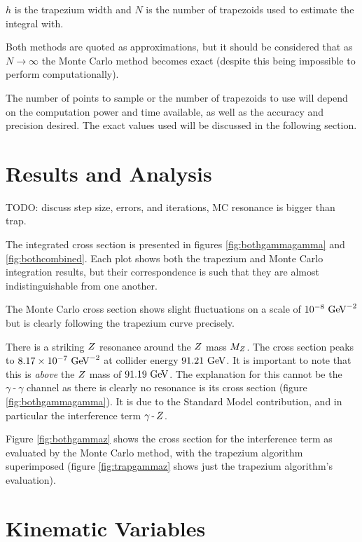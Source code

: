 \documentclass[]{article}
\providecommand{\e}[1]{\ensuremath{\times 10^{#1}}}
\begin{document}
$h$ is the trapezium width and $N$ is the number of trapezoids used to estimate the integral with.

Both methods are quoted as approximations, but it should be considered that as $N \to \infty$ the Monte Carlo method becomes exact (despite this being impossible to perform computationally).

The number of points to sample or the number of trapezoids to use will depend on the computation power and time available, as well as the accuracy and precision desired. The exact values used will be discussed in the following section.


\section{Results and Analysis}\label{sec:results}

TODO: discuss step size, errors, and iterations, MC resonance is bigger than trap.

The integrated cross section is presented in figures \ref{fig:bothgammagamma} and \ref{fig:bothcombined}. Each plot shows both the trapezium and Monte Carlo integration results, but their correspondence is such that they are almost indistinguishable from one another.

The Monte Carlo cross section shows slight fluctuations on a scale of $10^{-8}\GeV^{-2}$ but is clearly following the trapezium curve precisely.

There is a striking $Z $ resonance around the $Z $ mass $M_{Z }$. The cross section peaks to $8.17\e{-7}\GeV^{-2}$ at collider energy $91.21\GeV$. It is important to note that this is \emph{above} the $Z $ mass of $91.19\GeV$. The explanation for this cannot be the $\gamma\operatorname{-}\gamma$ channel as there is clearly no resonance is its cross section (figure \ref{fig:bothgammagamma}). It is due to the Standard Model contribution, and in particular the interference term $\gamma\operatorname{-}Z $.

Figure \ref{fig:bothgammaz} shows the cross section for the interference term as evaluated by the Monte Carlo method, with the trapezium algorithm superimposed (figure \ref{fig:trapgammaz} shows just the trapezium algorithm's evaluation).


\section{Kinematic Variables}\label{sec:variables}
\end{document}

